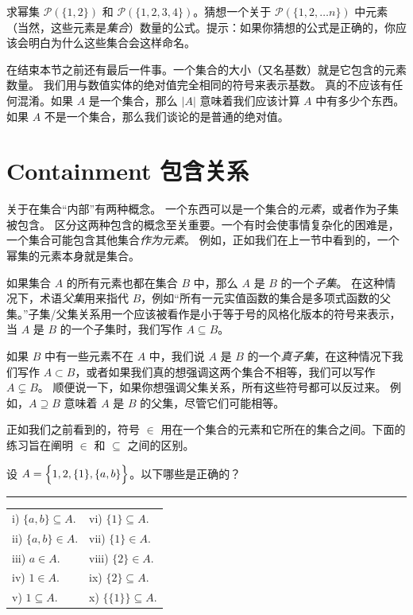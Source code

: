 \begin{exer} \rule{0pt}{0pt}
求幂集 $ {\mathcal P}(\{1, 2 \})$ 和 ${\mathcal P}(\{1, 2, 3, 4 \})$。猜想一个关于 ${\mathcal P}(\{1, 2, \ldots n \})$ 中元素（当然，这些元素是\emph{集合}）数量的公式。提示：如果你猜想的公式是正确的，你应该会明白为什么这些集合会这样命名。
\end{exer}

在结束本节之前还有最后一件事。一个集合的大小（又名基数）就是它包含的元素数量。
我们用与数值实体的绝对值完全相同的符号来表示基数。
真的不应该有任何混淆。如果 $A$ 是一个集合，那么 $|A|$ 意味着我们应该计算 $A$ 中有多少个东西。
如果 $A$ 不是一个集合，那么我们谈论的是普通的绝对值。

\clearpage 




\newpage

\section{Containment 包含关系}
\label{sec:cont}

关于在集合“内部”有两种概念。
一个东西可以是一个集合的\emph{元素}，或者作为子集被包含。
区分这两种包含的概念至关重要。一个有时会使事情复杂化的困难是，一个集合可能包含其他集合\emph{作为元素}。
例如，正如我们在上一节中看到的，一个幂集的元素本身就是集合。

如果集合 $A$ 的所有元素也都在集合 $B$ 中，那么 $A$ 是 $B$ 的一个\emph{子集}。
在这种情况下，术语\emph{父集}用来指代 $B$，例如“所有一元实值函数的集合是多项式函数的父集。”子集/父集关系用一个应该被看作是小于等于号的风格化版本的符号来表示，当 $A$ 是 $B$ 的一个子集时，我们写作 $A \subseteq B$。

如果 $B$ 中有一些元素不在 $A$ 中，我们说 $A$ 是 $B$ 的一个\emph{真子集}，在这种情况下我们写作 $A \subset B$，或者如果我们真的想强调这两个集合不相等，我们可以写作 $A \subsetneq B$。
顺便说一下，如果你想强调父集关系，所有这些符号都可以反过来。
例如，$A \supseteq B$ 意味着 $A$ 是 $B$ 的父集，尽管它们可能相等。

正如我们之前看到的，符号 $\in$ 用在一个集合的元素和它所在的集合之间。下面的练习旨在阐明 $\in$ 和 $\subseteq$ 之间的区别。
\begin{exer}
设 $A = \left\{ \rule{0pt}{10pt} 1, 2, \{ 1 \}, \{ a, b \} \right\}$。以下哪些是正确的？
\vfill

\rule{72pt}{0pt} \begin{tabular}{ll}
i) $ \{ a, b \} \subseteq A$. & vi) $  \{ 1 \} \subseteq A$.\\
ii) $ \{ a, b \} \in A$. & vii) $  \{ 1 \} \in A$.\\
iii) $  a \in A$. & viii) $  \{ 2 \} \in A$.\\
iv) $  1 \in A$. & ix) $  \{ 2 \} \subseteq A$.\\
v) $  1 \subseteq A$. & x) $  \{\{1\}\} \subseteq A$.\\
\end{tabular}
\end{exer}

